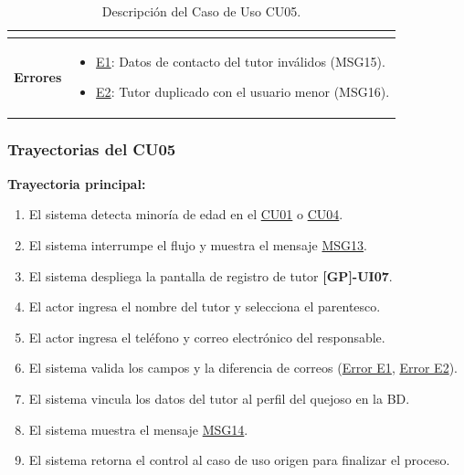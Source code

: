 \begin{appendices}
\begin{table}[htbp]
\begin{tabular}{|p{3.5cm}|p{10.5cm}|}
\begin{itemize}[nosep, leftmargin=*]
\end{itemize} \\ \hline
\textbf{Errores} & 
\begin{itemize}[nosep, leftmargin=*]
    \item \hyperlink{err:E8}{E1}: Datos de contacto del tutor inválidos (MSG15).
    \item \hyperlink{err:E9}{E2}: Tutor duplicado con el usuario menor (MSG16).
\end{itemize} \\ \hline
\end{tabular}
\caption{Descripción del Caso de Uso CU05.}
\label{tab:cu05_especificacion}
\end{table}

\subsubsection{Trayectorias del CU05}
\textbf{Trayectoria principal:}
\begin{enumerate}[nosep]
    \item El sistema detecta minoría de edad en el \hyperlink{anexo:casos_uso}{CU01} o \hyperlink{anexo:casos_uso}{CU04}.
    \item El sistema interrumpe el flujo y muestra el mensaje \hyperlink{msg:MSG13}{MSG13}.
    \item El sistema despliega la pantalla de registro de tutor \textbf{[GP]-UI07}.
    \item El actor ingresa el nombre del tutor y selecciona el parentesco.
    \item El actor ingresa el teléfono y correo electrónico del responsable.
    \item El sistema valida los campos y la diferencia de correos (\hyperlink{err:E8}{Error E1}, \hyperlink{err:E9}{Error E2}).
    \item El sistema vincula los datos del tutor al perfil del quejoso en la BD.
    \item El sistema muestra el mensaje \hyperlink{msg:MSG14}{MSG14}.
    \item El sistema retorna el control al caso de uso origen para finalizar el proceso.
\end{enumerate}


\end{appendices}
